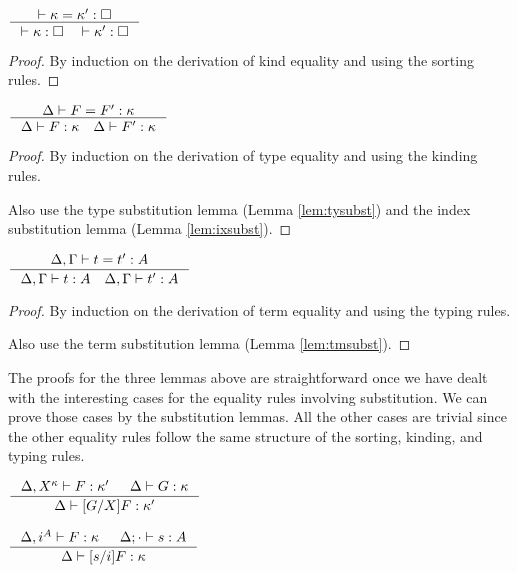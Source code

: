 \begin{lemma}\label{lem:wfeqkind}
$ \inference{|- \kappa = \kappa':\square}
	{|- \kappa:\square \quad |- \kappa':\square} $
\end{lemma}
\begin{proof}
	By induction on the derivation of kind equality
	and using the sorting rules.
\end{proof}

\begin{lemma}\label{lem:wfeqtype}
$ \inference{\Delta |- F = F':\kappa}
	{\Delta |- F:\kappa \quad \Delta |- F':\kappa} $
\end{lemma}
\begin{proof}
	By induction on the derivation of type equality
	and using the kinding rules.

	Also use the type substitution lemma (Lemma \ref{lem:tysubst})
	and the index substitution lemma (Lemma \ref{lem:ixsubst}).
\end{proof}

\begin{lemma}\label{lem:wfeqterm}
$ \inference{\Delta,\Gamma |- t = t':A}
	{\Delta,\Gamma |- t:A \quad \Delta,\Gamma |- t':A} $
\end{lemma}
\begin{proof}
	By induction on the derivation of term equality
	and using the typing rules.

	Also use the term substitution lemma (Lemma \ref{lem:tmsubst}).
\end{proof}

The proofs for the three lemmas above are straightforward
once we have dealt with the interesting cases for the equality rules
involving substitution. We can prove those cases by the substitution lemmas.
All the other cases are trivial since the other equality rules follow the
same structure of the sorting, kinding, and typing rules.

\begin{lemma}\label{lem:tysubst}
$ \inference{\Delta,X^\kappa |- F:\kappa' & \Delta |- G:\kappa}
	{\Delta |- [G/X]F:\kappa'} $
\end{lemma}

\begin{lemma}\label{lem:ixsubst}
$ \inference{\Delta,i^A |- F:\kappa & \Delta;\cdot |- s:A}
	{\Delta |- [s/i]F:\kappa} $
\end{lemma}

